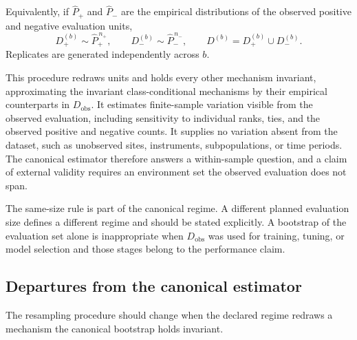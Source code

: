 \documentclass[11pt]{article}
\theoremstyle{remark}
\begin{document}
Equivalently, if $\widehat P_+$ and $\widehat P_-$ are the empirical distributions of the observed positive and negative evaluation units,
\[
D_+^{(b)}\sim \widehat P_+^{\,n_+},
\qquad
D_-^{(b)}\sim \widehat P_-^{\,n_-},
\qquad
D^{(b)}=D_+^{(b)}\cup D_-^{(b)}.
\]
Replicates are generated independently across $b$.

This procedure redraws units and holds every other mechanism invariant, approximating the invariant class-conditional mechanisms by their empirical counterparts in $D_{\mathrm{obs}}$. It estimates finite-sample variation visible from the observed evaluation, including sensitivity to individual ranks, ties, and the observed positive and negative counts. It supplies no variation absent from the dataset, such as unobserved sites, instruments, subpopulations, or time periods. The canonical estimator therefore answers a within-sample question, and a claim of external validity requires an environment set the observed evaluation does not span.

The same-size rule is part of the canonical regime. A different planned evaluation size defines a different regime and should be stated explicitly. A bootstrap of the evaluation set alone is inappropriate when $D_{\mathrm{obs}}$ was used for training, tuning, or model selection and those stages belong to the performance claim.

\subsection{Departures from the canonical estimator}

The resampling procedure should change when the declared regime redraws a mechanism the canonical bootstrap holds invariant.
\end{document}
